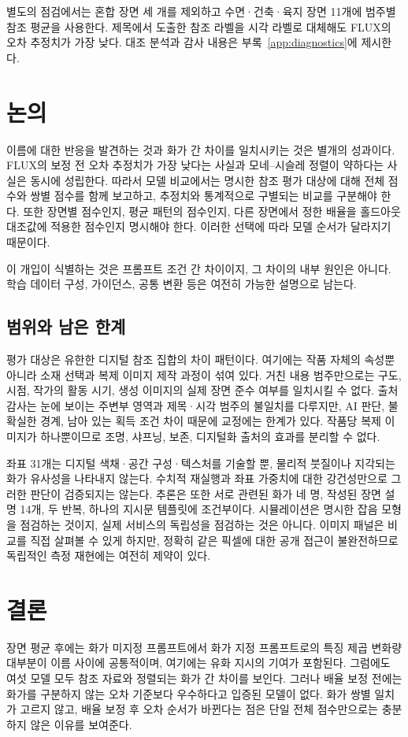 \documentclass[11pt,a4paper]{article}
\begin{document}
별도의 점검에서는 혼합 장면 세 개를 제외하고 수면·건축·육지 장면 11개에 범주별 참조 평균을 사용한다. 제목에서 도출한 참조 라벨을 시각 라벨로 대체해도 FLUX의 오차 추정치가 가장 낮다. 대조 분석과 감사 내용은 부록~\ref{app:diagnostics}에 제시한다.

\section{논의}\label{sec:discussion}
이름에 대한 반응을 발견하는 것과 화가 간 차이를 일치시키는 것은 별개의 성과이다. FLUX의 보정 전 오차 추정치가 가장 낮다는 사실과 모네--시슬레 정렬이 약하다는 사실은 동시에 성립한다. 따라서 모델 비교에서는 명시한 참조 평가 대상에 대해 전체 점수와 쌍별 점수를 함께 보고하고, 추정치와 통계적으로 구별되는 비교를 구분해야 한다. 또한 장면별 점수인지, 평균 패턴의 점수인지, 다른 장면에서 정한 배율을 홀드아웃 대조값에 적용한 점수인지 명시해야 한다. 이러한 선택에 따라 모델 순서가 달라지기 때문이다.

이 개입이 식별하는 것은 프롬프트 조건 간 차이이지, 그 차이의 내부 원인은 아니다. 학습 데이터 구성, 가이던스, 공통 변환 등은 여전히 가능한 설명으로 남는다.

\subsection{범위와 남은 한계}
평가 대상은 유한한 디지털 참조 집합의 차이 패턴이다. 여기에는 작품 자체의 속성뿐 아니라 소재 선택과 복제 이미지 제작 과정이 섞여 있다. 거친 내용 범주만으로는 구도, 시점, 작가의 활동 시기, 생성 이미지의 실제 장면 준수 여부를 일치시킬 수 없다. 출처 감사는 눈에 보이는 주변부 영역과 제목·시각 범주의 불일치를 다루지만, AI 판단, 불확실한 경계, 남아 있는 획득 조건 차이 때문에 교정에는 한계가 있다. 작품당 복제 이미지가 하나뿐이므로 조명, 샤프닝, 보존, 디지털화 출처의 효과를 분리할 수 없다.

좌표 31개는 디지털 색채·공간 구성·텍스처를 기술할 뿐, 물리적 붓질이나 지각되는 화가 유사성을 나타내지 않는다. 수치적 재실행과 좌표 가중치에 대한 강건성만으로 그러한 판단이 검증되지는 않는다. 추론은 또한 서로 관련된 화가 네 명, 작성된 장면 설명 14개, 두 반복, 하나의 지시문 템플릿에 조건부이다. 시뮬레이션은 명시한 잡음 모형을 점검하는 것이지, 실제 서비스의 독립성을 점검하는 것은 아니다. 이미지 패널은 비교를 직접 살펴볼 수 있게 하지만, 정확히 같은 픽셀에 대한 공개 접근이 불완전하므로 독립적인 측정 재현에는 여전히 제약이 있다.

\section{결론}
장면 평균 후에는 화가 미지정 프롬프트에서 화가 지정 프롬프트로의 특징 제곱 변화량 대부분이 이름 사이에 공통적이며, 여기에는 유화 지시의 기여가 포함된다. 그럼에도 여섯 모델 모두 참조 자료와 정렬되는 화가 간 차이를 보인다. 그러나 배율 보정 전에는 화가를 구분하지 않는 오차 기준보다 우수하다고 입증된 모델이 없다. 화가 쌍별 일치가 고르지 않고, 배율 보정 후 오차 순서가 바뀐다는 점은 단일 전체 점수만으로는 충분하지 않은 이유를 보여준다.
\end{document}

